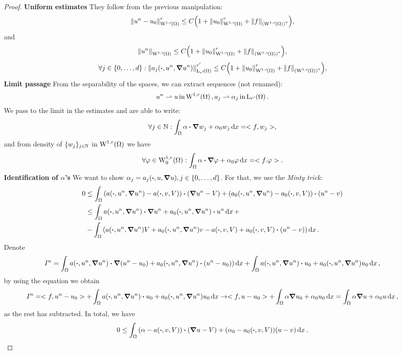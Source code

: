 \documentclass{article}
\begin{document}
\begin{proof}
	\textbf{Uniform estimates}
	They follow from the previous manipulation:
	\[
		\norm{u^n-u_0}_{\WkpSet[1][r]{\Omega}}^r\leq C\qty(1+\norm{u_0}_{\WkpSet[1][r]{\Omega}}^r+ \norm{f}_{\qty(\WkpSet[1][r]{\Omega})^{*}}),
	\]
	and
	\[
		\norm{u^n}_{\WkpSet[1][r]{\Omega}} \leq C\qty(1+\norm{u_0}_{\WkpSet[1][r]{\Omega}}^r+ \norm{f}_{\qty(\WkpSet[1][r]{\Omega})^{*}}),
	\]
	\[
		\forall j \in \{0,\dots,d\}: \norm{a_j\qty(\vdot, u^n, \grad u^n)}_{\LpSet[r']{\Omega}}^{r'} \leq C\qty(1+\norm{u_0}_{\WkpSet[1][r]{\Omega}}^r+ \norm{f}_{\qty(\WkpSet[1][r]{\Omega})^{*}}),
	\]
	\textbf{Limit passage}
	From the separability of the spaces, we can extract sequences (not renamed):
	\[
		u^n \rightharpoonup u \, \text{in} \, \WkpSet[1][r]{\Omega}, a_j \rightharpoonup \alpha_j \, \text{in} \, \LpSet[r']{\Omega}.
	\]
	We pass to the limit in the estimates and are able to write:
	\[
		\forall j \in \N: \int_{\Omega}\alpha \vdot \grad w_j + \alpha_0 w_j\dd{x} = <f,w_j>,
	\]
	and from density of $\{w_j\}_{j \in {\mathbb N}}$ in $\WkpSet[1][r]{\Omega}$ we have
	\[
		\forall \varphi \in \WkpzeroSet[1][r]{\Omega}: \int_{\Omega}\alpha \vdot \grad \varphi + \alpha_0 \varphi\dd{x} = <f. \varphi>.
	\]
	\textbf{Identification of $\alpha$'s}
	We want to show $\alpha_j = a_j\qty(\vdot, u, \grad u), j \in \{0, \dots, d\}$. For that, we use the \textit{Minty trick}:
	\begin{align*}
		0 &\leq \int_{\Omega }\qty(a\qty(\vdot, u^n, \grad u^n) - a\qty(\vdot,v,V))\vdot\qty(\grad u^n - V) + \qty(a_0\qty(\vdot,u^n,\grad u^n)-a_0\qty(\vdot,v,V))\vdot \qty(u^n -v) \\
		  &\leq \int_{\Omega}a\qty(\vdot, u^n, \grad u^n)\vdot \grad u^n + a_0\qty(\vdot, u^n, \grad u^n)\vdot u^n \dd{x} + \\
		  &- \int_{\Omega}\qty(a\qty(\vdot, u^n, \grad u^n)V + a_0\qty(\vdot, u^n, \grad u^n)v-a\qty(\vdot,v,V)+a_0\qty(\vdot,v,V)\vdot\qty(u^n-v))\dd{x}.
	\end{align*}
	Denote
	\[
		I^n = \int_{\Omega}a\qty(\vdot, u^n, \grad u^n) \vdot \grad \qty(u^n-u_0)+ a_0\qty(\vdot, u^n, \grad u^n)\vdot \qty(u^n - u_0))\dd{x} + \int_{\Omega}a\qty(\vdot, u^n, \grad u^n)\vdot u_0 + a_0(\vdot, u^n, \grad u^n)u_0\dd{x},
	\]
	by using the equation we obtain
	\[
		I^n = <f, u^n - u_0> + \int_{\Omega}a\qty(\vdot, u^n, \grad u^n)\vdot u_0 + a_0(\vdot, u^n, \grad u^n)u_0\dd{x} \to <f,u-u_0> + \int_{\Omega}\alpha \grad u_0 + \alpha_0 u_0\dd{x} = \int_{\Omega}\alpha \grad u + \alpha_0 u\dd{x},
	\]
	as the rest has subtracted. In total, we have
	\[
		0 \leq \int_{\Omega}\qty(\alpha - a\qty(\vdot, v, V))\vdot \qty(\grad u - V)+\qty(\alpha_0 - a_0\qty(\vdot, v, V))(u-v)\dd{x}.
\]
\end{proof}
\end{document}
